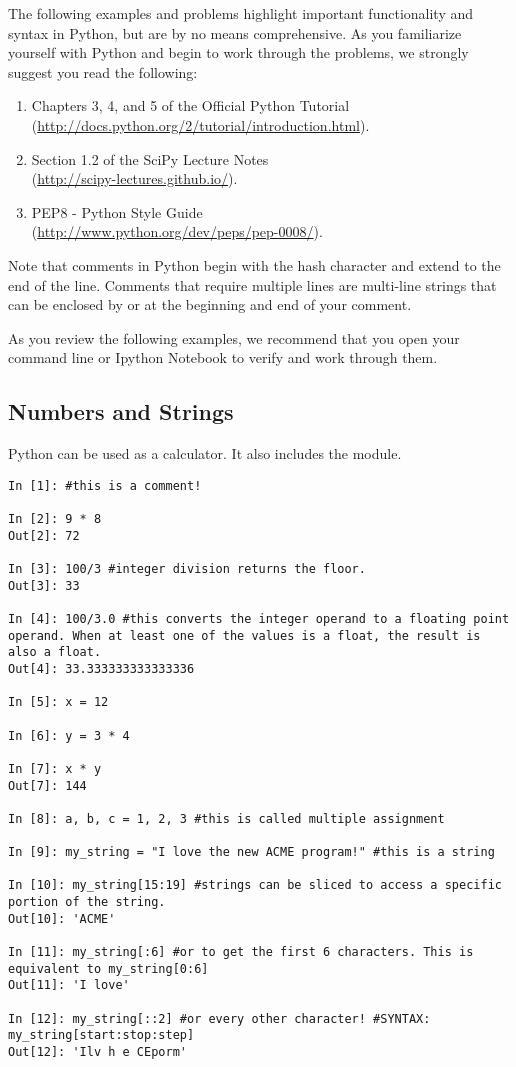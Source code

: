 The following examples and problems highlight important functionality
and syntax in Python, but are by no means comprehensive.
As you familiarize yourself with Python and begin to work through the problems,  we strongly suggest you read the following:
\begin{enumerate}
\item Chapters 3, 4, and 5 of the Official Python Tutorial \\
        (\url{http://docs.python.org/2/tutorial/introduction.html}).
\item Section 1.2 of the SciPy Lecture Notes \\
        (\url{http://scipy-lectures.github.io/}).
\item PEP8 - Python Style Guide \\
        (\url{http://www.python.org/dev/peps/pep-0008/}).
\end{enumerate}

Note that comments in Python begin with the hash character \li{#} 
and extend to the end of the line. Comments that require multiple
lines are multi-line strings that can be enclosed by  or  at the beginning 
and end of your comment. 


As you review the following examples, we recommend that you open your command line or Ipython Notebook to verify and work through them.

\subsection*{Numbers and Strings}

\begin{example}
Python can be used as a calculator. It also 
includes the  module.

\begin{lstlisting}
In [1]: #this is a comment!

In [2]: 9 * 8
Out[2]: 72

In [3]: 100/3 #integer division returns the floor.
Out[3]: 33

In [4]: 100/3.0 #this converts the integer operand to a floating point operand. When at least one of the values is a float, the result is also a float. 
Out[4]: 33.333333333333336

In [5]: x = 12

In [6]: y = 3 * 4

In [7]: x * y
Out[7]: 144

In [8]: a, b, c = 1, 2, 3 #this is called multiple assignment

In [9]: my_string = "I love the new ACME program!" #this is a string

In [10]: my_string[15:19] #strings can be sliced to access a specific portion of the string.
Out[10]: 'ACME'

In [11]: my_string[:6] #or to get the first 6 characters. This is equivalent to my_string[0:6]
Out[11]: 'I love'

In [12]: my_string[::2] #or every other character! #SYNTAX: my_string[start:stop:step]
Out[12]: 'Ilv h e CEporm'

\end{lstlisting}
\end{example}

